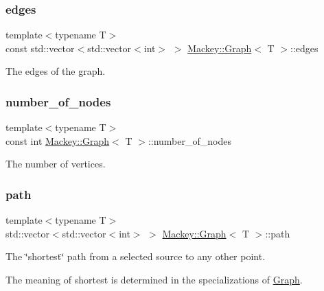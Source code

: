 \subsubsection{\texorpdfstring{edges}{edges}}
{\footnotesize\ttfamily template$<$typename T$>$ \\
const std\+::vector$<$std\+::vector$<$int$>$ $>$ \hyperlink{classMackey_1_1Graph}{Mackey\+::\+Graph}$<$ T $>$\+::edges\hspace{0.3cm}{\ttfamily [protected]}}



The edges of the graph. 

\mbox{\label{classMackey_1_1Graph_a870a7a373445fa2a8fc61bf51d39be9a}} 
\subsubsection{\texorpdfstring{number\+\_\+of\+\_\+nodes}{number\_of\_nodes}}
{\footnotesize\ttfamily template$<$typename T$>$ \\
const int \hyperlink{classMackey_1_1Graph}{Mackey\+::\+Graph}$<$ T $>$\+::number\+\_\+of\+\_\+nodes}



The number of vertices. 

\mbox{\label{classMackey_1_1Graph_a66fac95e623ca6e3e85ec33310755831}} 
\subsubsection{\texorpdfstring{path}{path}}
{\footnotesize\ttfamily template$<$typename T$>$ \\
std\+::vector$<$std\+::vector$<$int$>$ $>$ \hyperlink{classMackey_1_1Graph}{Mackey\+::\+Graph}$<$ T $>$\+::path}



The \char`\"{}shortest\char`\"{} path from a selected source to any other point. 

The meaning of shortest is determined in the specializations of \hyperlink{classMackey_1_1Graph}{Graph}. \mbox{\label{classMackey_1_1Graph_a43657a07a21a2dcf422876400360ed5b}} 
